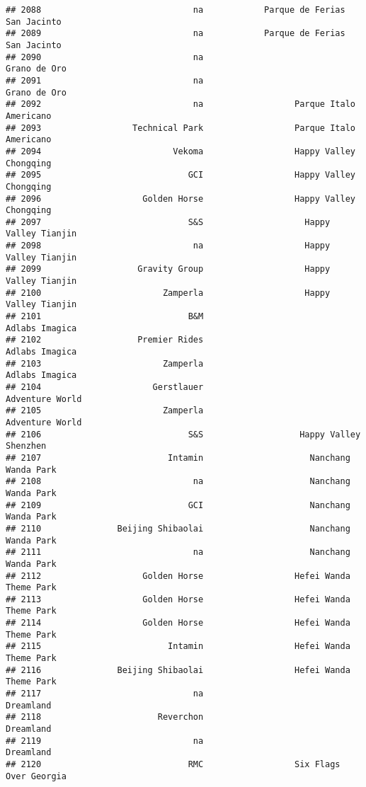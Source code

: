 \documentclass[
]{article}
\begin{document}
\begin{verbatim}
## 2088                              na            Parque de Ferias San Jacinto
## 2089                              na            Parque de Ferias San Jacinto
## 2090                              na                            Grano de Oro
## 2091                              na                            Grano de Oro
## 2092                              na                  Parque Italo Americano
## 2093                  Technical Park                  Parque Italo Americano
## 2094                          Vekoma                  Happy Valley Chongqing
## 2095                             GCI                  Happy Valley Chongqing
## 2096                    Golden Horse                  Happy Valley Chongqing
## 2097                             S&S                    Happy Valley Tianjin
## 2098                              na                    Happy Valley Tianjin
## 2099                   Gravity Group                    Happy Valley Tianjin
## 2100                        Zamperla                    Happy Valley Tianjin
## 2101                             B&M                          Adlabs Imagica
## 2102                   Premier Rides                          Adlabs Imagica
## 2103                        Zamperla                          Adlabs Imagica
## 2104                      Gerstlauer                         Adventure World
## 2105                        Zamperla                         Adventure World
## 2106                             S&S                   Happy Valley Shenzhen
## 2107                         Intamin                     Nanchang Wanda Park
## 2108                              na                     Nanchang Wanda Park
## 2109                             GCI                     Nanchang Wanda Park
## 2110               Beijing Shibaolai                     Nanchang Wanda Park
## 2111                              na                     Nanchang Wanda Park
## 2112                    Golden Horse                  Hefei Wanda Theme Park
## 2113                    Golden Horse                  Hefei Wanda Theme Park
## 2114                    Golden Horse                  Hefei Wanda Theme Park
## 2115                         Intamin                  Hefei Wanda Theme Park
## 2116               Beijing Shibaolai                  Hefei Wanda Theme Park
## 2117                              na                               Dreamland
## 2118                       Reverchon                               Dreamland
## 2119                              na                               Dreamland
## 2120                             RMC                  Six Flags Over Georgia

\end{verbatim}
\end{document}
